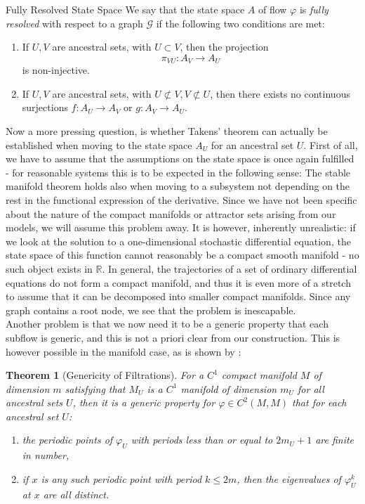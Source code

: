 \documentclass[11pt, a4paper]{memoir}
\theoremstyle{break}
\newtheorem{thm}{Theorem}
\theoremstyle{break}
\theoremstyle{nonumberplain}
\newcommand{\mR}{\mathbb{R}}
\begin{document}
\begin{mydefinition}{Fully Resolved State Space}
We say that the state space $A$ of flow $\varphi$ is \emph{fully resolved} with respect to a graph $\mathcal{G}$ if the following two conditions are met:
\begin{enumerate}[label=\roman*)]
	\item If $U,V$ are ancestral sets, with $U\subset V$, then the projection 
	$$\pi_{VU}:A_V\to A_U$$
	is non-injective.
	\item If $U,V$ are ancestral sets, with $U\not\subset V, V\not\subset U$, then there exists no continuous surjections
	$f:A_U\to A_V$ or $g:A_V\to A_U$.
\end{enumerate}
\end{mydefinition}
Now a more pressing question, is whether Takens' theorem can actually be established when moving to the state space $A_U$ for an ancestral set $U$. First of all, we have to assume that the assumptions on the state space is once again fulfilled - for reasonable systems this is to be expected in the following sense: The stable manifold theorem holds also when moving to a subsystem not depending on the rest in the functional expression of the derivative. Since we have not been specific about the nature of the compact manifolds or attractor sets arising from our models, we will assume this problem away. It is however, inherently unrealistic: if we look at the solution to a one-dimensional stochastic differential equation, the state space of this function cannot reasonably be a compact smooth manifold - no such object exists in $\mR$. In general, the trajectories of a set of ordinary differential equations do not form a compact manifold, and thus it is even more of a stretch to assume that it can be decomposed into smaller compact manifolds. Since any graph contains a root node, we see that the problem is inescapable.\\[5pt]
Another problem is that we now need it to be a generic property that each subflow is generic, and this is not a priori clear from our construction. This is however possible in the manifold case, as is shown by \cite{mathFound}:
\begin{thm}[Genericity of Filtrations]
For a $C^1$ compact manifold $M$ of dimension $m$ satisfying that $M_U$ is a $C^1$ manifold of dimension $m_U$ for all ancestral sets $U$, then it is a generic property for $\varphi\in C^2(M,M)$ that for each ancestral set $U$: 
\begin{enumerate}[label=\arabic*)]
	\item the periodic points of $\varphi_U$ with periods less than or equal to $2m_U+1$ are finite in number,
	\item if $x$ is any such periodic point with period $k\leqslant 2m$, then the eigenvalues of $\varphi^k_U$ at $x$ are all distinct.
\end{enumerate}
\end{thm}
\end{document}
